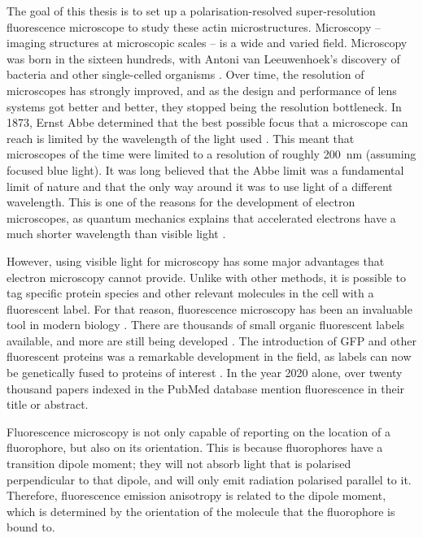 The goal of this thesis is to set up a polarisation-resolved super-resolution fluorescence microscope to study these actin microstructures.	Microscopy -- imaging structures at microscopic scales -- is a wide and varied field. Microscopy was born in the sixteen hundreds, with Antoni van Leeuwenhoek's discovery of bacteria and other single-celled organisms \cite{VanZuylen1981}. Over time, the resolution of microscopes has strongly improved, and as the design and performance of lens systems got better and better, they stopped being the resolution bottleneck. In 1873, Ernst Abbe determined that the best possible focus that a microscope can reach is limited by the wavelength of the light used \cite{Abbe1873}. This meant that microscopes of the time were limited to a resolution of roughly 200~nm (assuming focused blue light). It was long believed that the Abbe limit was a fundamental limit of nature and that the only way around it was to use light of a different wavelength. This is one of the reasons for the development of electron microscopes, as quantum mechanics explains that accelerated electrons have a much shorter wavelength than visible light \cite{Smith2008}. 

However, using visible light for microscopy has some major advantages that electron microscopy cannot provide. Unlike with other methods, it is possible to tag specific protein species and other relevant molecules in the cell with a fluorescent label. For that reason, fluorescence microscopy has been an invaluable tool in modern biology \cite{Danial2016}.  There are thousands of small organic fluorescent labels available, and more are still being developed \cite{Zhang2002, Resch-Genger2008}. The introduction of GFP and other fluorescent proteins was a remarkable development in the field, as labels can now be genetically fused to proteins of interest \cite{Shaner2005, Matlashov2020}. In the year 2020 alone, over twenty thousand papers indexed in the PubMed database mention fluorescence in their title or abstract.

Fluorescence microscopy is not only capable of reporting on the location of a fluorophore, but also on its orientation. This is because fluorophores have a transition dipole moment; they will not absorb light that is polarised perpendicular to that dipole, and will only emit radiation polarised parallel to it. Therefore, fluorescence emission anisotropy is related to the dipole moment, which is determined by the orientation of the molecule that the fluorophore is bound to.

